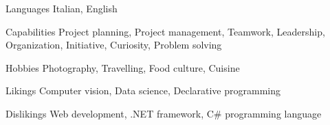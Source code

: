 \begin{minipage}[]{0.4\textwidth}
  \vspace{2.0mm}

  \begin{cvskills}
    \hspace{4.0mm}
    \cvskill
      {Languages}
      {Italian, English}
    
    \cvskill
      {Capabilities}
      {Project planning, Project management, Teamwork, Leadership, Organization, Initiative, Curiosity, Problem solving}

    \cvskill
      {Hobbies}
      {Photography, Travelling, Food culture, Cuisine}
  \end{cvskills}
\end{minipage}%
\begin{minipage}[]{0.6\textwidth}
  \hfill
\end{minipage}
\vspace{2.0mm}


\begin{minipage}[]{0.4\textwidth}
  \vspace{2.0mm}

  \begin{cvskills}
    \hspace{10.0mm}
    \cvskill
      {Likings}
      {Computer vision, Data science, Declarative programming}
    
    \cvskill
      {Dislikings}
      {Web development, .NET framework, C\# programming language}
  \end{cvskills}
\end{minipage}%
\begin{minipage}[]{0.6\textwidth}
  \hfill
\end{minipage}
\vspace{4.0mm}
